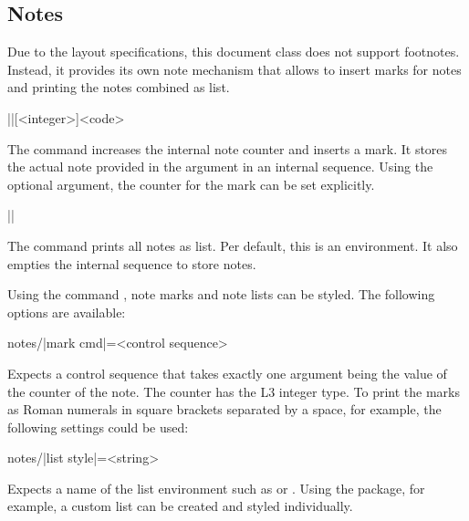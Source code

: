 \documentclass[a4paper]{article}
\begin{document}
\begin{codeexample}

\end{codeexample}

\subsection{Notes}

Due to the layout specifications, this document class does not support footnotes. Instead, it provides its own note mechanism that allows to insert marks for notes and printing the notes combined as list.

\begin{macrodef}
|\leporellonote|[<integer>]{<code>}
\end{macrodef}
The command \macro{\leporellonote} increases the internal note counter and inserts a mark. It stores the actual note provided in the argument in an internal sequence. Using the optional argument, the counter for the mark can be set explicitly.

\begin{macrodef}
|\leporelloprintnotes|
\end{macrodef}
The command \macro{\leporelloprintnotes} prints all notes as list. Per default, this is an  environment. It also empties the internal sequence to store notes.

Using the command \macro{\leporelloset}, note marks and note lists can be styled. The following options are available:

\begin{macrodef}
notes/|mark cmd|={<control sequence>}
\end{macrodef}
Expects a control sequence that takes exactly one argument being the value of the counter of the note. The counter has the L3 integer type. To print the marks as Roman numerals in square brackets separated by a space, for example, the following settings could be used:

\begin{codeexample}
\end{codeexample}

\begin{macrodef}
notes/|list style|={<string>}
\end{macrodef}
Expects a name of the list environment such as  or . Using the  package, for example, a custom list can be created and styled individually.
\end{document}
